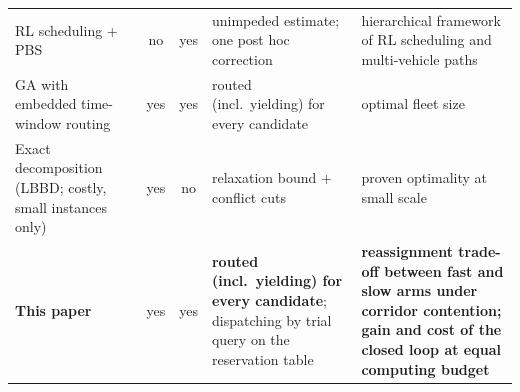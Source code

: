 \begin{table}[t]
\begin{tabular}{@{}p{2.5cm}cccp{2.9cm}p{3.1cm}@{}}
RL scheduling + PBS & \cite{li2026framework}
  & no & yes & unimpeded estimate; one post hoc correction & hierarchical framework of RL scheduling and multi-vehicle paths \\
GA with embedded time-window routing & \cite{lyu2019approach}
  & yes & yes & routed (incl.\ yielding) for every candidate & optimal fleet size \\
Exact decomposition (LBBD; costly, small instances only) & \cite{vanos2026exact}
  & yes & no & relaxation bound + conflict cuts & proven optimality at small scale \\
\textbf{This paper} &
  & yes & yes & \textbf{routed (incl.\ yielding) for every candidate}; dispatching by trial query on the reservation table & \textbf{reassignment trade-off between fast and slow arms under corridor contention; gain and cost of the closed loop at equal computing budget} \\
\bottomrule
\end{tabular}
\end{table}


